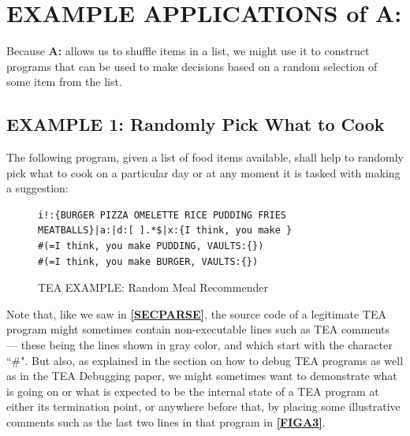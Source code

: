 \documentclass[a4paper, 18pt]{book} %
\begin{document}
\section{EXAMPLE APPLICATIONS of A:}
\label{SECEXAMPA}

Because \textbf{A:} allows us to shuffle items in a list, we might use it to construct programs that can be used to make decisions based on a random selection of some item from the list. 

\subsection{EXAMPLE 1: Randomly Pick What to Cook}
\label{SECEXAMP1A}

The following program, given a list of food items available, shall help to randomly pick what to cook on a particular day or at any moment it is tasked with making a suggestion:


 \begin{figure}[H]
 \Large
  \centering
  \begin{tcolorbox}[teaterminalstyle, title=TEA Program: randomly suggest what to cook]
  \begin{lstlisting}[language=TEA]
i!:{BURGER PIZZA OMELETTE RICE PUDDING FRIES 
MEATBALLS}|a:|d:[ ].*$|x:{I think, you make }
#(=I think, you make PUDDING, VAULTS:{})
#(=I think, you make BURGER, VAULTS:{})
   \end{lstlisting}
  \end{tcolorbox}
  \caption{TEA EXAMPLE: Random Meal Recommender}
  \label{FIGA3}
\end{figure}

Note that, like we saw in \textbf{\autoref{SECPARSE}}, the source code of a legitimate TEA program might sometimes contain non-executable lines such as TEA comments --- these being the lines shown in gray color, and which start with the character ``\#". But also, as explained in the section on how to debug TEA programs as well as in the TEA Debugging paper\cite{Lutalo2025debug}, we might sometimes want to demonstrate what is going on or what is expected to be the internal state of a TEA program at either its termination point, or anywhere before that, by placing some illustrative comments such as the last two lines in that program in \textbf{\autoref{FIGA3}}.




\end{document}
